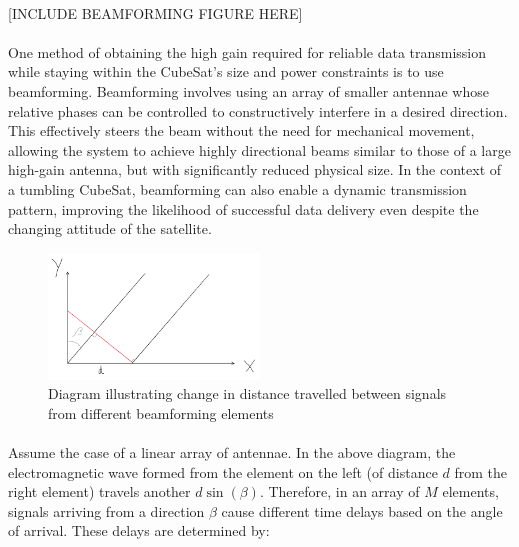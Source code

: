 \documentclass[11pt]{article}
\begin{document}
	\paragraph{}[INCLUDE BEAMFORMING FIGURE HERE]
	
	\paragraph{} One method of obtaining the high gain required for reliable data transmission while staying within the CubeSat’s size and power constraints is to use beamforming. Beamforming involves using an array of smaller antennae whose relative phases can be controlled to constructively interfere in a desired direction. This effectively steers the beam without the need for mechanical movement, allowing the system to achieve highly directional beams similar to those of a large high-gain antenna, but with significantly reduced physical size. In the context of a tumbling CubeSat, beamforming can also enable a dynamic transmission pattern, improving the likelihood of successful data delivery even despite the changing attitude of the satellite.
	
	\begin{figure}[H]
		\centering
		\includegraphics[width=0.5\textwidth]{beamform.png}
		\caption{Diagram illustrating change in distance travelled between signals from different beamforming elements }
	\end{figure}
	
	\paragraph{}Assume the case of a linear array of antennae. In the above diagram, the electromagnetic wave formed from the element on the left (of distance \(d\) from the right element) travels another \(d \sin(\beta)\). Therefore, in an array of \(M\) elements, signals arriving from a direction \(\beta\) cause different time delays based on the angle of arrival. These delays are determined by:
	
	
	
\end{document}
